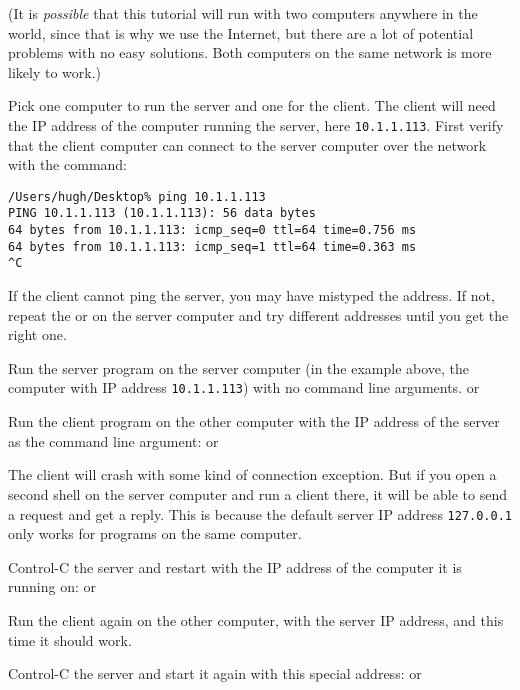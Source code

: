 (It is \emph{possible} that this tutorial will run with two computers anywhere in the world,
since that is why we use the Internet, but there are a lot of potential problems
with no easy solutions. Both computers on the same network is more likely to work.)

Pick one computer to run the server and one for the client. The client will need the IP
address of the computer running the server, here \texttt{10.1.1.113}.
First verify that the client computer can
connect to the server computer over the network with the  command:

\begin{CODE}\begin{verbatim}
/Users/hugh/Desktop% ping 10.1.1.113
PING 10.1.1.113 (10.1.1.113): 56 data bytes
64 bytes from 10.1.1.113: icmp_seq=0 ttl=64 time=0.756 ms
64 bytes from 10.1.1.113: icmp_seq=1 ttl=64 time=0.363 ms
^C
\end{verbatim}\end{CODE}

If the client cannot ping the server, you may have mistyped the address.
If not, repeat the  or  on the server computer and try
different addresses until you get the right one.

\STEP Run the server program on the server computer (in the example above, the computer
with IP address \texttt{10.1.1.113}) with no command line arguments.
or

Run the client program on the other computer with the IP address of the server
as the command line argument:
or

The client will crash with some kind of connection exception. But if you open a second
shell on the server computer and run a client there, it will be able to send a request
and get a reply.
This is because the default server IP address \texttt{127.0.0.1}
only works for programs on the same computer.

\STEP Control-C the server and restart with the IP address of the computer it is running on:
or

Run the client again on the other computer, with the server IP address, and this time
it should work.

\STEP Control-C the server and start it again with this special address:
or

